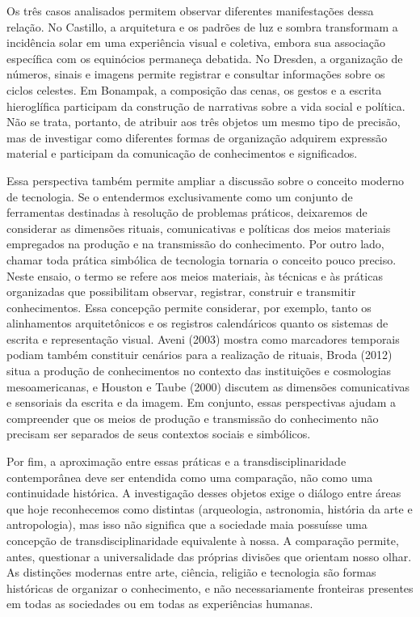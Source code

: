 \documentclass[11pt, a4paper]{article}
\begin{document}
Os três casos analisados permitem observar diferentes manifestações dessa relação. No Castillo, a arquitetura e os padrões de luz e sombra transformam a incidência solar em uma experiência visual e coletiva, embora sua associação específica com os equinócios permaneça debatida. No Dresden, a organização de números, sinais e imagens permite registrar e consultar informações sobre os ciclos celestes. Em Bonampak, a composição das cenas, os gestos e a escrita hieroglífica participam da construção de narrativas sobre a vida social e política. Não se trata, portanto, de atribuir aos três objetos um mesmo tipo de precisão, mas de investigar como diferentes formas de organização adquirem expressão material e participam da comunicação de conhecimentos e significados.

Essa perspectiva também permite ampliar a discussão sobre o conceito moderno de tecnologia. Se o entendermos exclusivamente como um conjunto de ferramentas destinadas à resolução de problemas práticos, deixaremos de considerar as dimensões rituais, comunicativas e políticas dos meios materiais empregados na produção e na transmissão do conhecimento. Por outro lado, chamar toda prática simbólica de tecnologia tornaria o conceito pouco preciso. Neste ensaio, o termo se refere aos meios materiais, às técnicas e às práticas organizadas que possibilitam observar, registrar, construir e transmitir conhecimentos. Essa concepção permite considerar, por exemplo, tanto os alinhamentos arquitetônicos e os registros calendáricos quanto os sistemas de escrita e representação visual. Aveni (2003) mostra como marcadores temporais podiam também constituir cenários para a realização de rituais, Broda (2012) situa a produção de conhecimentos no contexto das instituições e cosmologias mesoamericanas, e Houston e Taube (2000) discutem as dimensões comunicativas e sensoriais da escrita e da imagem. Em conjunto, essas perspectivas ajudam a compreender que os meios de produção e transmissão do conhecimento não precisam ser separados de seus contextos sociais e simbólicos.

Por fim, a aproximação entre essas práticas e a transdisciplinaridade contemporânea deve ser entendida como uma comparação, não como uma continuidade histórica. A investigação desses objetos exige o diálogo entre áreas que hoje reconhecemos como distintas (arqueologia, astronomia, história da arte e antropologia), mas isso não significa que a sociedade maia possuísse uma concepção de transdisciplinaridade equivalente à nossa. A comparação permite, antes, questionar a universalidade das próprias divisões que orientam nosso olhar. As distinções modernas entre arte, ciência, religião e tecnologia são formas históricas de organizar o conhecimento, e não necessariamente fronteiras presentes em todas as sociedades ou em todas as experiências humanas.
\end{document}
